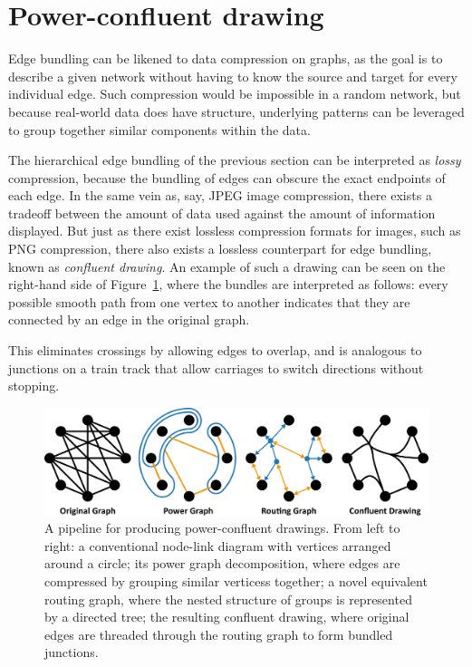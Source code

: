 \section{Power-confluent drawing}
\label{sec:power_confluent_drawing}
Edge bundling can be likened to data compression on graphs, as the goal is to describe a given network without having to know the source and target for every individual edge. 
Such compression would be impossible in a random network, but because real-world data does have structure, underlying patterns can be leveraged to group together similar components within the data.

The hierarchical edge bundling of the previous section can be interpreted as \emph{lossy} compression, because the bundling of edges can obscure the exact endpoints of each edge. In the same vein as, say, JPEG image compression, there exists a tradeoff between the amount of data used against the amount of information displayed.
But just as there exist lossless compression formats for images, such as PNG compression, there also exists a lossless counterpart for edge bundling, known as \emph{confluent drawing}. An example of such a drawing can be seen on the right-hand side of Figure~\ref{fig:power_teaser}, where the bundles are interpreted as follows: every possible smooth path from one vertex to another indicates that they are connected by an edge in the original graph.

This eliminates crossings by allowing edges to overlap, and is analogous to junctions on a train track that allow carriages to switch directions without stopping.

\begin{figure}
  \centering
  \includegraphics[width=\textwidth]{power/teaser.pdf}
  \caption[A power-confluent drawing pipeline]{A pipeline for producing power-confluent drawings. 
  From left to right: a conventional node-link diagram with vertices arranged around a circle; its power graph decomposition, where edges are compressed by grouping similar verticess together; a novel equivalent routing graph, where the nested structure of groups is represented by a directed tree; the resulting confluent drawing, where original edges are threaded through the routing graph to form bundled junctions.}
  \label{fig:power_teaser}
\end{figure}

